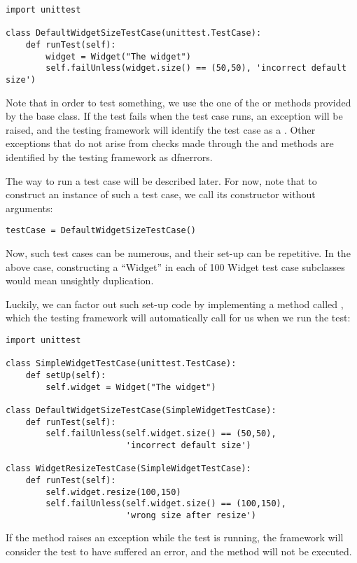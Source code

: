 \begin{verbatim}
import unittest

class DefaultWidgetSizeTestCase(unittest.TestCase):
    def runTest(self):
        widget = Widget("The widget")
        self.failUnless(widget.size() == (50,50), 'incorrect default size')
\end{verbatim}

Note that in order to test something, we use the one of the
 or  methods provided by the
 base class.  If the test fails when the test case
runs, an exception will be raised, and the testing framework will
identify the test case as a .  Other exceptions that do
not arise from checks made through the  and
 methods are identified by the testing framework as
dfn{errors}.

The way to run a test case will be described later.  For now, note
that to construct an instance of such a test case, we call its
constructor without arguments:

\begin{verbatim}
testCase = DefaultWidgetSizeTestCase()
\end{verbatim}

Now, such test cases can be numerous, and their set-up can be
repetitive.  In the above case, constructing a ``Widget'' in each of
100 Widget test case subclasses would mean unsightly duplication.

Luckily, we can factor out such set-up code by implementing a method
called , which the testing framework will
automatically call for us when we run the test:

\begin{verbatim}
import unittest

class SimpleWidgetTestCase(unittest.TestCase):
    def setUp(self):
        self.widget = Widget("The widget")

class DefaultWidgetSizeTestCase(SimpleWidgetTestCase):
    def runTest(self):
        self.failUnless(self.widget.size() == (50,50),
                        'incorrect default size')

class WidgetResizeTestCase(SimpleWidgetTestCase):
    def runTest(self):
        self.widget.resize(100,150)
        self.failUnless(self.widget.size() == (100,150),
                        'wrong size after resize')
\end{verbatim}

If the  method raises an exception while the test is
running, the framework will consider the test to have suffered an
error, and the  method will not be executed.


